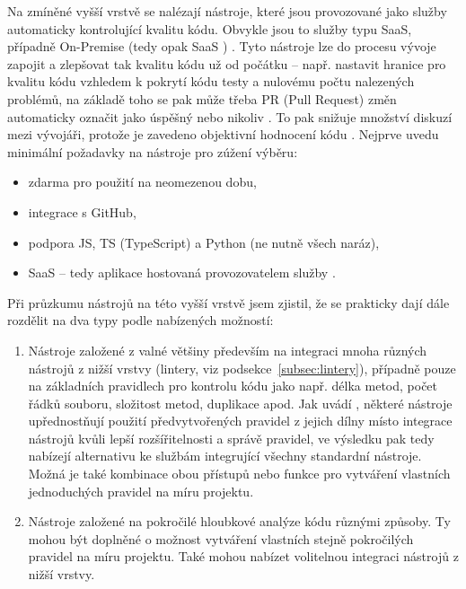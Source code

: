 Na zmíněné vyšší vrstvě se nalézají nástroje, které jsou provozované jako služby automaticky kontrolující kvalitu kódu. Obvykle jsou to služby typu SaaS, případně On-Premise (tedy opak SaaS \cite{globema-onpremise}) \cite{codebeat-engines}. Tyto nástroje lze do procesu vývoje zapojit a zlepšovat tak kvalitu kódu už od počátku -- např. nastavit hranice pro kvalitu kódu vzhledem k pokrytí kódu testy a nulovému počtu nalezených problémů, na základě toho se pak může třeba PR (Pull Request) změn automaticky označit jako úspěšný nebo nikoliv \cite{medium-devgurus}. To pak snižuje množství diskuzí mezi vývojáři, protože je zavedeno objektivní hodnocení kódu \cite{medium-devgurus}. Nejprve uvedu minimální požadavky na nástroje pro zúžení výběru:
\begin{itemize}
    \item zdarma pro použití na neomezenou dobu,
    \item integrace s GitHub,
    \item podpora JS, TS (TypeScript) a Python (ne nutně všech naráz),
    \item SaaS -- tedy aplikace hostovaná provozovatelem služby \cite{oracle-saas}.
\end{itemize}

Při průzkumu nástrojů na této vyšší vrstvě jsem zjistil, že se prakticky dají dále rozdělit na dva typy podle nabízených možností:
\begin{enumerate}
    \item Nástroje založené z valné většiny především na integraci mnoha různých nástrojů z nižší vrstvy (lintery, viz podsekce~\ref{subsec:lintery}), případně pouze na základních pravidlech pro kontrolu kódu jako např. délka metod, počet řádků souboru, složitost metod, duplikace apod. Jak uvádí \cite{globema-onpremise}, některé nástroje upřednostňují použití předvytvořených pravidel z jejich dílny místo integrace nástrojů kvůli lepší rozšířitelnosti a správě pravidel, ve výsledku pak tedy nabízejí alternativu ke službám integrující všechny standardní nástroje. Možná je také kombinace obou přístupů nebo funkce pro vytváření vlastních jednoduchých pravidel na míru projektu.
    \item Nástroje založené na pokročilé hloubkové analýze kódu různými způsoby. Ty mohou být doplněné o možnost vytváření vlastních stejně pokročilých pravidel na míru projektu. Také mohou nabízet volitelnou integraci nástrojů z nižší vrstvy.
\end{enumerate}

